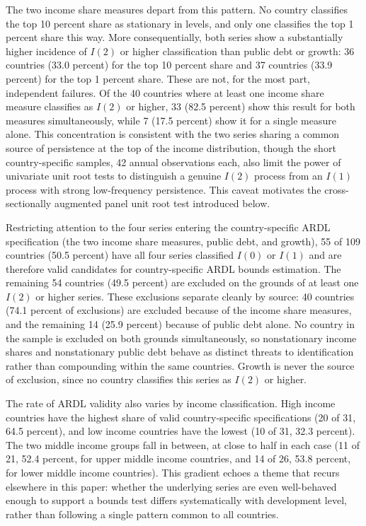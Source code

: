 \documentclass[12pt, titlepage]{article}
\numberwithin{equation}{section}
\begin{document}
The two income share measures depart from this pattern. No country classifies
the top 10 percent share as stationary in levels, and only one classifies the
top 1 percent share this way. More consequentially, both series show a
substantially higher incidence of $I(2)$ or higher classification than public
debt or growth: 36 countries (33.0 percent) for the top 10 percent share and
37 countries (33.9 percent) for the top 1 percent share. These are not, for
the most part, independent failures. Of the 40 countries where at least one
income share measure classifies as $I(2)$ or higher, 33 (82.5 percent) show
this result for both measures simultaneously, while 7 (17.5 percent) show it
for a single measure alone. This concentration is consistent with the two
series sharing a common source of persistence at the top of the income
distribution, though the short country-specific samples, 42 annual
observations each, also limit the power of univariate unit root tests to
distinguish a genuine $I(2)$ process from an $I(1)$ process with strong
low-frequency persistence. This caveat motivates the cross-sectionally
augmented panel unit root test introduced below.

Restricting attention to the four series entering the country-specific ARDL
specification (the two income share measures, public debt, and growth), 55 of
109 countries (50.5 percent) have all four series classified $I(0)$ or $I(1)$
and are therefore valid candidates for country-specific ARDL bounds
estimation. The remaining 54 countries (49.5 percent) are excluded on the
grounds of at least one $I(2)$ or higher series. These exclusions separate
cleanly by source: 40 countries (74.1 percent of exclusions) are excluded
because of the income share measures, and the remaining 14 (25.9 percent)
because of public debt alone. No country in the sample is excluded on both
grounds simultaneously, so nonstationary income shares and nonstationary
public debt behave as distinct threats to identification rather than
compounding within the same countries. Growth is never the source of
exclusion, since no country classifies this series as $I(2)$ or higher.

The rate of ARDL validity also varies by income classification. High income
countries have the highest share of valid country-specific specifications (20
of 31, 64.5 percent), and low income countries have the lowest (10 of 31,
32.3 percent). The two middle income groups fall in between, at close to half
in each case (11 of 21, 52.4 percent, for upper middle income countries, and
14 of 26, 53.8 percent, for lower middle income countries). This gradient
echoes a theme that recurs elsewhere in this paper: whether the underlying
series are even well-behaved enough to support a bounds test differs
systematically with development level, rather than following a single
pattern common to all countries.
\end{document}
